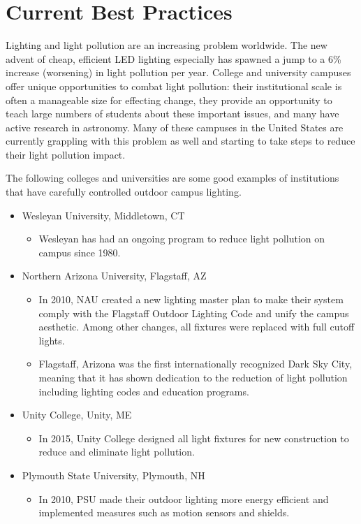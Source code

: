 \documentclass[12pt, oneside]{article}
\begin{document}
\section{Current Best Practices}
Lighting and light pollution are an increasing problem worldwide. The new advent of cheap, efficient LED lighting especially has spawned a jump to a 6\% increase (worsening) in light pollution per year. 
College and university campuses offer unique opportunities to combat light pollution: their institutional scale is often a manageable size for effecting change, they provide an opportunity to teach large numbers of students about these important issues, and many have active research in astronomy. Many of these campuses in the United States are currently grappling with this problem as well and starting to take steps to reduce their light pollution impact. 

The following colleges and universities are some good examples of institutions that have carefully controlled outdoor campus lighting.
\begin{itemize}
\item Wesleyan University, Middletown, CT
\begin{itemize}
\item Wesleyan has had an ongoing program to reduce light pollution on campus since 1980. 
\end{itemize}
\item Northern Arizona University, Flagstaff, AZ
\begin{itemize}
\item In 2010, NAU created a new lighting master plan to make their system comply with the Flagstaff Outdoor Lighting Code and unify the campus aesthetic. Among other changes, all fixtures were replaced with full cutoff lights.
\item Flagstaff, Arizona was the first internationally recognized Dark Sky City, meaning that it has shown dedication to the reduction of light pollution including lighting codes and education programs. 
\end{itemize}
\item Unity College, Unity, ME
\begin{itemize}
\item In 2015, Unity College designed all light fixtures for new construction to reduce and eliminate light pollution. 
\end{itemize}
\item Plymouth State University, Plymouth, NH
\begin{itemize}
\item In 2010, PSU made their outdoor lighting more energy efficient and implemented measures such as motion sensors and shields.
\end{itemize}
\end{itemize}
\end{document}
